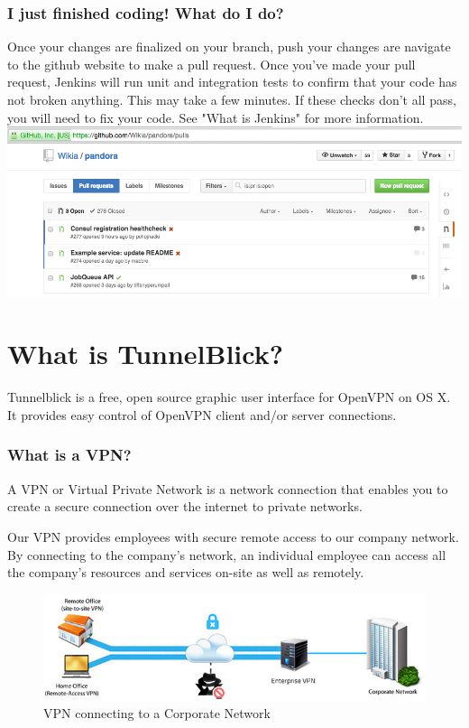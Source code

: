\documentclass[oneside]{book}
\begin{document}
\subsection{I just finished coding! What do I do?}
Once your changes are finalized on your branch, push your changes are navigate to the github website to make a pull request. Once you've made your pull request, Jenkins will run unit and integration tests to confirm that your code has not broken anything. This may take a few minutes. If these checks don't all pass, you will need to fix your code. See "What is Jenkins" for more information. \\
\newline
\includegraphics[scale=0.4]{pullrequest.png}
\chapter{What is TunnelBlick?}
Tunnelblick is a free, open source graphic user interface for OpenVPN on OS X. It provides easy control of OpenVPN client and/or server connections.
\subsection{What is a VPN?}
A VPN or Virtual Private Network is a network connection that enables you to create a secure connection over the internet to private networks.\par
Our VPN provides employees with secure remote access to our company network. By connecting to the company's network, an individual employee can access all the company's resources and services on-site as well as remotely.
\begin{figure}[h!]
\centering
	\includegraphics[scale=0.3]{VPN.png}
	\caption{VPN connecting to a Corporate Network}
\end{figure}
\end{document}
